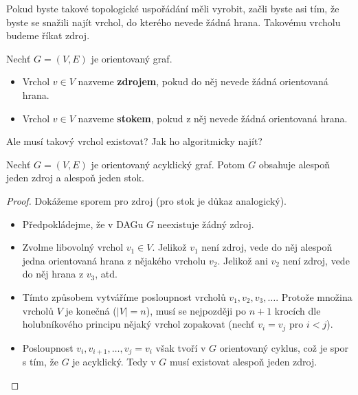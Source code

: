 \medskip

\noindent Pokud byste takové topologické uspořádání měli vyrobit, začli byste asi tím, že byste se snažili najít vrchol, do kterého nevede žádná hrana. Takovému vrcholu budeme říkat zdroj.

\medskip

\begin{definition}
Nechť $G = (V, E)$ je orientovaný graf.
\begin{itemize}
    \item Vrchol $v \in V$ nazveme \textbf{zdrojem}, pokud do něj nevede žádná orientovaná hrana.
    \item Vrchol $v \in V$ nazveme \textbf{stokem}, pokud z něj nevede žádná orientovaná hrana.
\end{itemize}
\end{definition}

\medskip

\noindent Ale musí takový vrchol existovat? Jak ho algoritmicky najít?

\medskip

\begin{theorem}
Nechť $G = (V, E)$ je orientovaný acyklický graf. Potom $G$ obsahuje alespoň jeden zdroj a alespoň jeden stok.
\end{theorem}

\begin{proof}
Dokážeme sporem pro zdroj (pro stok je důkaz analogický).
\begin{itemize}
    \item Předpokládejme, že v DAGu $G$ neexistuje žádný zdroj.
    
    \item Zvolme libovolný vrchol $v_1 \in V$. Jelikož $v_1$ není zdroj, vede do něj alespoň jedna orientovaná hrana z nějakého vrcholu $v_2$. Jelikož ani $v_2$ není zdroj, vede do něj hrana z $v_3$, atd.

    \item Tímto způsobem vytváříme posloupnost vrcholů $v_1, v_2, v_3, \dots$. Protože množina vrcholů $V$ je konečná ($|V| = n$), musí se nejpozději po $n + 1$ krocích dle holubníkového principu nějaký vrchol zopakovat (nechť $v_i = v_j$ pro $i < j$).

    \item Posloupnost $v_i, v_{i+1}, \dots, v_j = v_i$ však tvoří v $G$ orientovaný cyklus, což je spor s tím, že $G$ je acyklický. Tedy v $G$ musí existovat alespoň jeden zdroj.

\end{itemize}
\end{proof}


